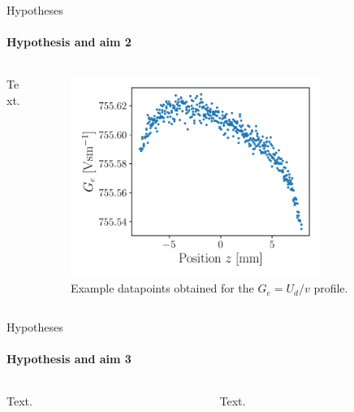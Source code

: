 \documentclass{beamer}
\begin{document}
\begin{frame}[allowframebreaks]{Hypotheses}
  \framesubtitle{Hypothesis and aim 2}

  \begin{columns}
    \begin{column}{0.49\textwidth}
    Text.
    \end{column}
    
    \begin{column}{0.5\textwidth}
      \begin{figure}[h!] 
	\centering
	\includegraphics[width=0.8\textwidth]{figures/Ge_example.pdf}
	\caption{Example datapoints obtained for the $G_e = U_d/v$ profile.}
	\label{fig:U_d_over_v_profile}
      \end{figure}
    \end{column}
  \end{columns}
\end{frame}

\begin{frame}[allowframebreaks]{Hypotheses}
  \framesubtitle{Hypothesis and aim 3}

  \begin{columns}
    \begin{column}{0.49\textwidth}
    Text.
    \end{column}
    
    \begin{column}{0.5\textwidth}
    Text.
    \end{column}
  \end{columns}
\end{frame}
\end{document}
